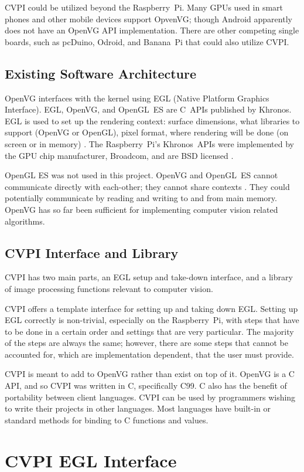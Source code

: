 \documentclass[12pt]{report}
\begin{document}
CVPI could be utilized beyond the Raspberry~Pi. Many GPUs used in
smart phones and other mobile devices support OpvenVG; though Android
apparently does not have an OpenVG API implementation. There are other
competing single boards, such as pcDuino, Odroid, and Banana~Pi that
could also utilize CVPI.
\section{Existing Software Architecture}
\label{sec-1-2}
OpenVG interfaces with the kernel using EGL (Native Platform Graphics
Interface). EGL, OpenVG, and OpenGL~ES are C~APIs published by
Khronos. EGL is used to set up the rendering context: surface
dimensions, what libraries to support (OpenVG or OpenGL), pixel
format, where rendering will be done (on screen or in memory)
\cite{egl}. The Raspberry~Pi's Khronos~APIs were implemented by the
GPU chip manufacturer, Broadcom, and are BSD licensed \cite{rPiVid}.

OpenGL ES was not used in this project. OpenVG and OpenGL~ES cannot
communicate directly with each-other; they cannot share contexts
\cite[p.~7]{egl}. They could potentially communicate by reading and
writing to and from main memory. OpenVG has so far been sufficient for
implementing computer vision related algorithms.
\section{CVPI Interface and Library}
\label{sec-1-3}
CVPI has two main parts, an EGL setup and take-down interface, and a
library of image processing functions relevant to computer vision.

CVPI offers a template interface for setting up and taking down
EGL. Setting up EGL correctly is non-trivial, especially on the
Raspberry~Pi, with steps that have to be done in a certain order and
settings that are very particular. The majority of the steps are
always the same; however, there are some steps that cannot be
accounted for, which are implementation dependent, that the user must
provide.

CVPI is meant to add to OpenVG rather than exist on top of it. OpenVG
is a C API, and so CVPI was written in C, specifically C99. C also
has the benefit of portability between client languages. CVPI can be
used by programmers wishing to write their projects in other
languages. Most languages have built-in or standard methods for binding
to C functions and values.
\chapter{CVPI EGL Interface}
\label{sec-2}
\end{document}
